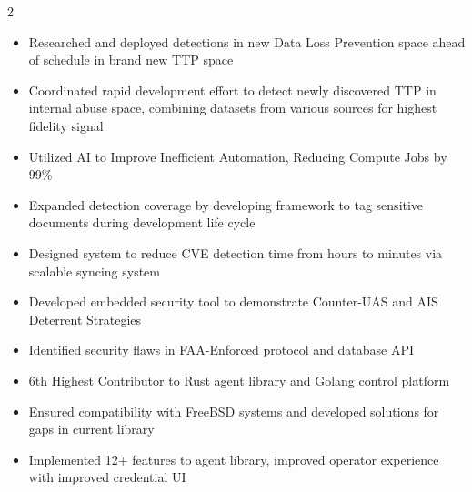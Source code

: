 \documentclass[10pt,a4paper,ragged2e,withhyper]{altacv}
\begin{document}


  
\makecvheader



\begin{paracol}{2}

\begin{itemize}
\item Researched and deployed detections in new Data Loss Prevention space ahead of schedule in brand new TTP space
\item Coordinated rapid development effort to detect newly discovered TTP in internal abuse space, combining datasets from various sources for highest fidelity signal
\item Utilized AI to Improve Inefficient Automation, Reducing Compute Jobs by 99\%
\end{itemize}

\divider

\begin{itemize}
\item Expanded detection coverage by developing framework to tag sensitive documents during development life cycle
\item Designed system to reduce CVE detection time from hours to minutes via scalable syncing system
\end{itemize}


\divider

\begin{itemize}
\item Developed embedded security tool to demonstrate Counter-UAS and AIS Deterrent Strategies
\item Identified security flaws in FAA-Enforced protocol and database API
\end{itemize}


\begin{itemize}
\item 6th Highest Contributor to Rust agent library and Golang control platform
\item Ensured compatibility with FreeBSD systems and developed solutions for gaps in current library
\item Implemented 12+ features to agent library, improved operator experience with improved credential UI
\end{itemize}


\end{paracol}
\end{document}
